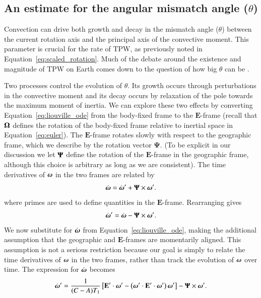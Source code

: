 \documentclass[preprint,12pt,authoryear]{elsarticle}
\newcommand{\mitbf}[1]{\hbox{\mathversion{bold}$#1$}}
\begin{document}
\subsection{An estimate for the angular mismatch angle ($\theta$)}
\label{sec:theta}

Convection can drive both growth and decay in the mismatch angle ($\theta$) between the current rotation axis and the principal axis of the convective moment. 
This parameter is crucial for the rate of TPW, as previously noted in Equation~\eqref{eq:scaled_rotation}.  
Much of the debate around the existence and magnitude of TPW on Earth comes down to the question of how big $\theta$ can be \citep{kirschvink1997evidence, steinberger1997changes}.

Two processes control the evolution of $\theta$. Its growth occurs through perturbations in the convective moment and 
its decay occurs by relaxation of the pole towards the maximum moment of inertia.
We can explore these two effects by converting Equation~\eqref{eq:liouville_ode}
from the body-fixed frame to the $\mathbf{E}$-frame (recall that $\mitbf{\Omega}$ defines
the rotation of the body-fixed frame relative to inertial space in Equation~\eqref{eq:euler}).
The $\mathbf{E}$-frame rotates slowly with respect to the geographic frame, 
which we describe by the rotation vector $\mathbf{\Psi}$. 
(To be explicit in our discussion we let $\mitbf{\Psi}$ define the rotation of the $\mathbf{E}$-frame in the geographic frame, 
although this choice is arbitrary as long as we are consistent). The time derivatives of $\mitbf{\omega}$ in the two frames are related by 
\begin{equation}
\dot{\mitbf{\omega}} = \dot{\mitbf{\omega}}^\prime + \mathbf{\Psi}\times \mitbf{\omega}^\prime.
\end{equation}
where primes are used to define quantities in the $\mathbf{E}$-frame. Rearranging gives 
\begin{equation}
\dot{\mitbf{\omega}}^{\prime} = \dot{\mitbf{\omega}} - \mathbf{\Psi}\times \mitbf{\omega}^\prime.
\end{equation}
We now substitute for $\dot{\mitbf{\omega}}$ from Equation~\eqref{eq:liouville_ode}, 
making the additional assumption that the geographic and $\mathbf{E}$-frames are momentarily aligned. 
This assumption is not a serious restriction because our goal is simply to relate the time derivatives of $\mitbf{\omega}$ in the two frames, 
rather than track the evolution of $\mitbf{\omega}$ over time. The expression for $\dot{\mitbf{\omega}}$ becomes
\begin{equation}
 \dot{\mitbf{\omega}}^\prime  = \frac{1}{(C-A)T_1} \left[ \mathbf{E}^\prime \cdot \mitbf{\omega}^\prime - \left( \mitbf{\omega}^\prime \cdot \mathbf{E}^\prime \cdot \mitbf{\omega}^\prime  \right) \mitbf{\omega}^\prime \right] - \mathbf{\Psi}\times \mitbf{\omega}^\prime.
\label{eq:liouville_ode_new_frame}
\end{equation}
\end{document}
